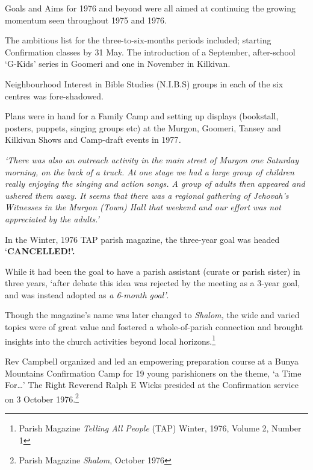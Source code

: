 Goals and Aims for 1976 and beyond were all aimed at continuing the growing momentum seen throughout 1975 and 1976.



The ambitious list for the three-to-six-months periods included; starting Confirmation classes by 31 May. The introduction of a September, after-school `G-Kids' series in Goomeri and one in November in Kilkivan.



Neighbourhood Interest in Bible Studies (N.I.B.S) groups in each of the six centres was fore-shadowed.



Plans were in hand for a Family Camp and setting up displays (bookstall, posters, puppets, singing groups etc) at the Murgon, Goomeri, Tansey and Kilkivan Shows and Camp-draft events in 1977\emph{.}



\emph{`There was also an outreach activity in the main street of Murgon one Saturday morning, on the back of a truck. At one stage we had a large group of children really enjoying the singing and action songs. A group of adults then appeared and ushered them away. It seems that there was a regional gathering of Jehovah's Witnesses in the Murgon (Town) Hall that weekend and our effort was not appreciated by the adults.'}



In the Winter, 1976 TAP parish magazine, the three-year goal was headed `\textbf{CANCELLED!'.}



While it had been the goal to have a parish assistant (curate or parish sister) in three years, `after debate this idea was rejected by the meeting as a 3-year goal, and was instead adopted as \emph{a 6}-\emph{month goal'}.



Though the magazine's name was later changed to \emph{Shalom,} the wide and varied topics were of great value and fostered a whole-of-parish connection and brought insights into the church activities beyond local horizons.\footnote{Parish Magazine \emph{Telling All People} (TAP) Winter, 1976, Volume 2, Number 1}


Rev Campbell organized and led an empowering preparation course at a Bunya Mountains Confirmation Camp for 19 young parishioners on the theme, `a Time For\ldots' The Right Reverend Ralph E Wicks presided at the Confirmation service on 3 October 1976.\footnote{Parish Magazine \emph{Shalom}, October 1976}


